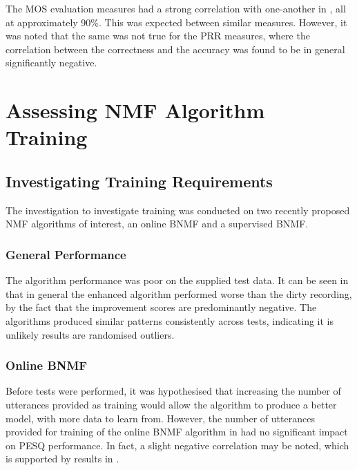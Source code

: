 The \ac{MOS} evaluation measures had a strong correlation with one-another
in , all at approximately 90\%. This was expected
between similar measures. However, it was noted that the same was
not true for the \ac{PRR} measures, where the correlation between
the correctness and the accuracy was found to be in general significantly
negative.


\section{Assessing \acl{NMF} Algorithm Training}


\subsection{Investigating Training Requirements}

The investigation to investigate training was conducted on two recently
proposed \ac{NMF} algorithms of interest, an online \ac{BNMF} and
a supervised \ac{BNMF}.


\subsubsection*{General Performance}

The algorithm performance was poor on the supplied test data. It can
be seen in  that in general the enhanced
algorithm performed worse than the dirty recording, by the fact that
the improvement scores are predominantly negative. The algorithms
produced similar patterns consistently across tests, indicating it
is unlikely results are randomised outliers.


\subsubsection*{Online \acl{BNMF}}

Before tests were performed, it was hypothesised that increasing the
number of utterances provided as training would allow the algorithm
to produce a better model, with more data to learn from. However,
the number of utterances provided for training of the online \ac{BNMF}
algorithm in  had no significant impact on
\ac{PESQ} performance. In fact, a slight negative correlation may
be noted, which is supported by results in .
